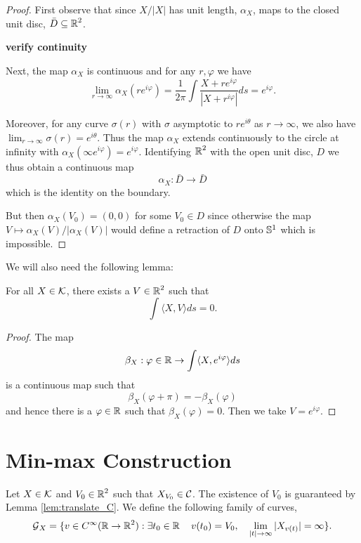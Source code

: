\documentclass[12pt]{article}
\begin{document}
\begin{proof}
First observe that since \(X/|X|\) has unit length, \(\alpha_X\), maps to the closed unit disc, \(\bar{D} \subseteq \operatorname{\mathbb{R}}^2\).

\textbf{verify continuity}

Next, the map \(\alpha_X\) is continuous and for any \(r, \varphi\) we have
\[
\lim_{r \to \infty} \alpha_X (r e^{i\varphi}) = \frac{1}{2\pi} \int \frac{X + re^{i\varphi}}{|X + r^{i\varphi}|} ds = e^{i\varphi}.
\]

Moreover, for any curve \(\sigma(r)\) with \(\sigma\) asymptotic to \(r e^{i\theta}\) as \(r \to \infty\), we also have \(\lim_{r\to\infty} \sigma(r) = e^{i\theta}\). Thus the map \(\alpha_X\) extends continuously to the circle at infinity with \(\alpha_X(\infty e^{i\varphi}) = e^{i\varphi}\). Identifying \(\operatorname{\mathbb{R}}^2\) with the open unit disc, \(D\) we thus obtain a continuous map
\[
\alpha_X : \bar{D} \to \bar{D}
\]
which is the identity on the boundary.

But then \(\alpha_X(V_0) = (0, 0)\) for some \(V_0 \in D\) since otherwise the map \(V \mapsto \alpha_X(V)/|\alpha_X(V)|\) would define a retraction of \(D\) onto \(\operatorname{\mathbb{S}^1}\) which is impossible.
\end{proof}

We will also need the following lemma:

\begin{lemma}
\label{lem:projection_C}
For all \(X \in \operatorname{\mathcal{K}}\), there exists a \(V \in \operatorname{\mathbb{R}}^2\) such that
\[
\int \langle X, V \rangle ds = 0.
\]
\end{lemma}

\begin{proof}
The map
\[
\beta_X : \varphi \in \operatorname{\mathbb{R}} \to \int \langle X, e^{i\varphi} \rangle ds
\]
is a continuous map such that
\[
\beta_X(\varphi + \pi) = -\beta_X(\varphi)
\]
and hence there is a \(\varphi \in \operatorname{\mathbb{R}}\) such that \(\beta_X(\varphi) = 0\). Then we take \(V = e^{i\varphi}\).
\end{proof}

\section{Min-max Construction}
\label{sec-2}

Let \(X \in \operatorname{\mathcal{K}}\) and \(V_0 \in \operatorname{\mathbb{R}}^2\) such that \(X_{V_0} \in \operatorname{\mathcal{C}}\). The existence of \(V_0\) is guaranteed by Lemma \ref{lem:translate_C}. We define the following family of curves,
\[
\operatorname{\mathcal{G}}_X = \lbrace v \in C^{\infty}(\operatorname{\mathbb{R}} \to \operatorname{\mathbb{R}}^2) : \exists t_0 \in \operatorname{\mathbb{R}} \quad v(t_0) = V_0, \quad \lim_{|t| \to \infty} |X_{v(t)}| = \infty \rbrace.
\]
\end{document}
